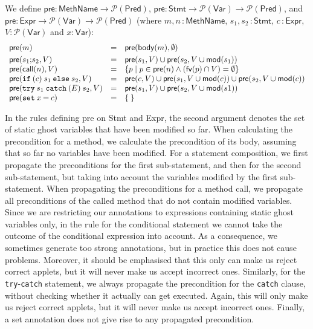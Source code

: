 \begin{definition}
We define
\(\mathsf{pre} \colon \mathsf{MethName} \rightarrow
\mathcal{P}(\mathsf{Pred})\),
\( \mathsf{pre}  \colon  \mathsf{Stmt} \rightarrow
\mathcal{P}(\mathsf{Var}) \rightarrow \mathcal{P}(\mathsf{Pred}) \), and
\( \mathsf{pre}  \colon  \mathsf{Expr} \rightarrow
\mathcal{P}(\mathsf{Var}) \rightarrow \mathcal{P}(\mathsf{Pred}) \)
(where \(m,n\,\colon\mathsf{MethName}\),
\(s_1,s_2\,\colon\mathsf{Stmt}\), \(c\,\colon\mathsf{Expr}\),
\(V\colon\mathcal{P}(\mathsf{Var})\) and \(x\colon\mathsf{Var}\)): 
\[
\begin{array}{lcl}
\mathsf{pre}(m) & = & \mathsf{pre}(\mathsf{body}(m), \emptyset) \smallskip\\
\mathsf{pre}(s_1 \mathtt{;} s_2, V) & = & \mathsf{pre}(s_1, V) \cup 
                                          \mathsf{pre}(s_2, V \cup \mathsf{mod}(s_1))\\

\mathsf{pre}(\mathsf{call}(n),V) & = & 
                \{ p \mid p \in \mathsf{pre}(n) \wedge 
                          (\mathsf{fv}(p) \cap V) = \emptyset\}\\
\mathsf{pre}(\mathtt{if\:(} c \mathtt{)\:} s_1 \mathtt{\:else\:} s_2, V) & = &
   \mathsf{pre}(c, V) \cup 
   \mathsf{pre}(s_1, V \cup \mathsf{mod}(c)) \cup
   \mathsf{pre}(s_2, V \cup \mathsf{mod}(c))\\
\mathsf{pre}(\mathtt{try\:} s_1 \mathtt{\:catch\:(} E \mathtt{)\:} s_2, V) & = & 
   \mathsf{pre}(s_1, V) \cup 
   \mathsf{pre}(s_2, V \cup \mathsf{mod}(s1))\\
\mathsf{pre}( \mathtt{set\:} x \mathtt{\:=\:} c) & = & \{\: \}
\end{array}
\]
\end{definition}

In the rules defining \textsf{pre} on \textsf{Stmt} and \textsf{Expr},
the second argument denotes the set of static ghost variables that have been
modified so far. When calculating the precondition for a method, we
calculate the precondition of its body, assuming that so far no variables
have been modified. For a statement composition, we first
propagate the preconditions for the first sub-statement, and then for
the second sub-statement, but taking into account the variables
modified by the first sub-statement. When propagating the preconditions
for a method call, we propagate all preconditions of the called method
that do not contain modified variables.  Since we are restricting our
annotations to expressions containing static ghost variables only, in
the rule for the conditional statement we cannot take the outcome of
the conditional expression into account. As a consequence, we
sometimes generate too strong annotations, but in practice this does
not cause problems. Moreover, it should be emphasised that this
only can make us reject correct applets, but it will never make us
accept incorrect ones.  Similarly, for the
\texttt{try}-\texttt{catch} statement, we always propagate the
precondition for the \texttt{catch} clause, without checking whether it
actually can get executed. Again, this will only make us reject
correct applets, but it will never make us accept incorrect
ones. Finally, a set annotation does not give rise to any propagated
precondition. 

